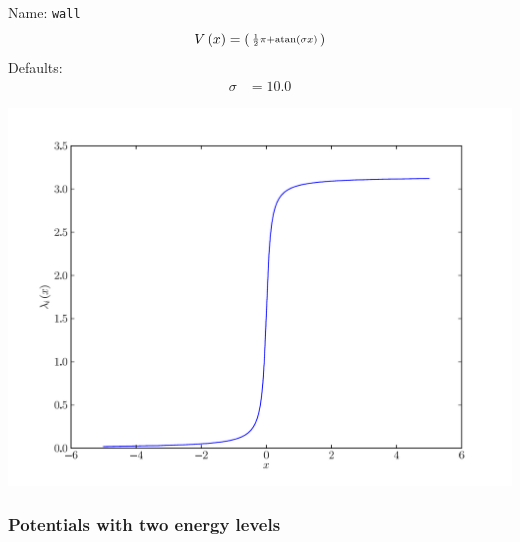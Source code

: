 \documentclass[a4paper,10pt]{report}
\begin{document}
\begin{minipage}{0.5\linewidth}
  Name:    \texttt{wall}
  \begin{equation*}
    V\left( x \right) = \left(\begin{smallmatrix}\frac{1}{2} \pi + \operatorname{atan}\left(\sigma x\right)\end{smallmatrix}\right)
  \end{equation*}
  Defaults:
  \begin{align*}
    \sigma & = 10.0
  \end{align*}
\end{minipage}
\begin{minipage}{0.5\linewidth}
  \begin{center}
    \includegraphics[scale=0.25]{./fig/wall.pdf}
  \end{center}
\end{minipage}


\subsubsection{Potentials with two energy levels}
\end{document}

